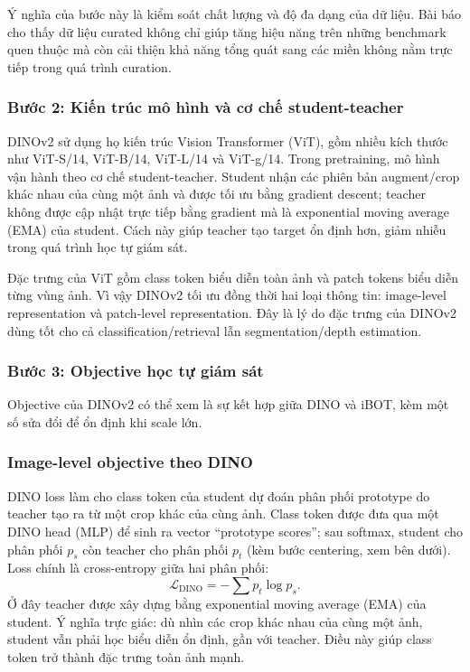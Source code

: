Ý nghĩa của bước này là kiểm soát chất lượng và độ đa dạng của dữ liệu. Bài báo cho thấy dữ liệu curated không chỉ giúp tăng hiệu năng trên những benchmark quen thuộc mà còn cải thiện khả năng tổng quát sang các miền không nằm trực tiếp trong quá trình curation.

\subsubsection*{Bước 2: Kiến trúc mô hình và cơ chế student-teacher}
DINOv2 sử dụng họ kiến trúc Vision Transformer (ViT), gồm nhiều kích thước như ViT-S/14, ViT-B/14, ViT-L/14 và ViT-g/14. Trong pretraining, mô hình vận hành theo cơ chế student-teacher. Student nhận các phiên bản augment/crop khác nhau của cùng một ảnh và được tối ưu bằng gradient descent; teacher không được cập nhật trực tiếp bằng gradient mà là exponential moving average (EMA) của student. Cách này giúp teacher tạo target ổn định hơn, giảm nhiễu trong quá trình học tự giám sát.

Đặc trưng của ViT gồm class token biểu diễn toàn ảnh và patch tokens biểu diễn từng vùng ảnh. Vì vậy DINOv2 tối ưu đồng thời hai loại thông tin: image-level representation và patch-level representation. Đây là lý do đặc trưng của DINOv2 dùng tốt cho cả classification/retrieval lẫn segmentation/depth estimation.

\subsubsection*{Bước 3: Objective học tự giám sát}
Objective của DINOv2 có thể xem là sự kết hợp giữa DINO và iBOT, kèm một số sửa đổi để ổn định khi scale lớn.

\subsubsection{Image-level objective theo DINO}
DINO loss làm cho class token của student dự đoán phân phối prototype do teacher tạo ra từ một crop khác của cùng ảnh. Class token được đưa qua một DINO head (MLP) để sinh ra vector ``prototype scores''; sau softmax, student cho phân phối $p_s$ còn teacher cho phân phối $p_t$ (kèm bước centering, xem bên dưới). Loss chính là cross-entropy giữa hai phân phối:
\begin{equation}
\mathcal{L}_{\mathrm{DINO}} = -\sum p_t \log p_s .
\end{equation}
Ở đây teacher được xây dựng bằng exponential moving average (EMA) của student. Ý nghĩa trực giác: dù nhìn các crop khác nhau của cùng một ảnh, student vẫn phải học biểu diễn ổn định, gần với teacher. Điều này giúp class token trở thành đặc trưng toàn ảnh mạnh.

